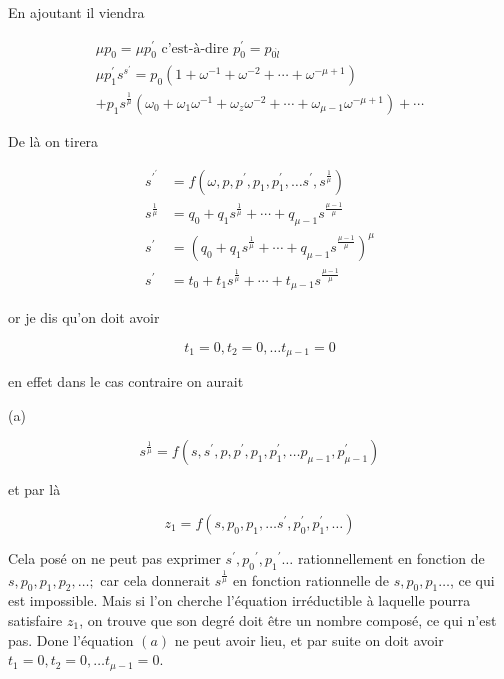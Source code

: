 \documentclass{article}
\begin{document}
En ajoutant il viendra

\[
\begin{gathered}
\mu p_{0}=\mu p_{0}^{\prime} \text { c'est-à-dire } p_{0}^{\prime}=p_{0 \grave{l}} \\
\mu p_{1}^{\prime} s^{s^{\prime}}=p_{0}\left(1+\omega^{-1}+\omega^{-2}+\cdots+\omega^{-\mu+1}\right) \\
+p_{1} s^{\frac{1}{\mu}}\left(\omega_{0}+\omega_{1} \omega^{-1}+\omega_{z} \omega^{-2}+\cdots+\omega_{\mu-1} \omega^{-\mu+1}\right)+\cdots
\end{gathered}
\]

De là on tirera

\[
\begin{aligned}
s^{\prime^{\prime}} & =f\left(\omega, p, p^{\prime}, p_{1}, p_{1}^{\prime}, \ldots s^{\prime}, s^{\frac{1}{\mu}}\right) \\
s^{\frac{1}{\mu}} & =q_{0}+q_{1} s^{\frac{1}{\mu}}+\cdots+q_{\mu-1} s^{\frac{\mu-1}{\mu}} \\
s^{\prime} & =\left(q_{0}+q_{1} s^{\frac{1}{\mu}}+\cdots+q_{\mu-1} s^{\frac{\mu-1}{\mu}}\right)^{\mu} \\
s^{\prime} & =t_{0}+t_{1} s^{\frac{1}{\mu}}+\cdots+t_{\mu-1} s^{\frac{\mu-1}{\mu}}
\end{aligned}
\]

or je dis qu'on doit avoir

\[
t_{1}=0, t_{2}=0, \ldots t_{\mu-1}=0
\]

en effet dans le cas contraire on aurait

(a)

\[
s^{\frac{1}{\mu}}=f\left(s, s^{\prime}, p, p^{\prime}, p_{1}, p_{1}^{\prime}, \ldots p_{\mu-1}, p_{\mu-1}^{\prime}\right)
\]

et par là

\[
z_{1}=f\left(s, p_{0}, p_{1}, \ldots s^{\prime}, p_{0}^{\prime}, p_{1}^{\prime}, \ldots\right)
\]

Cela posé on ne peut pas exprimer \(s^{\prime}, p_{0}{ }^{\prime}, p_{1}{ }^{\prime} \ldots\) rationnellement en fonction de \(s, p_{0}, p_{1}, p_{2}, \ldots ;\) car cela donnerait \(s^{\frac{1}{\mu}}\) en fonction rationnelle de \(s, p_{0}, p_{1} \ldots\), ce qui est impossible. Mais si l'on cherche l'équation irréductible à laquelle pourra satisfaire \(z_{1}\), on trouve que son degré doit être un nombre composé, ce qui n'est pas. Done l'équation \((a)\) ne peut avoir lieu, et par suite on doit avoir \(t_{1}=0, t_{2}=0, \ldots t_{\mu-1}=0\).
\end{document}
